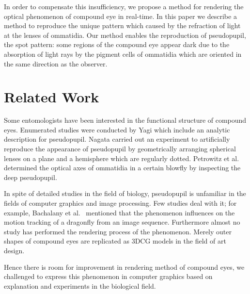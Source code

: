 In order to compensate this insufficiency, we propose a method for rendering the optical phenomenon of compound eye in real-time.
In this paper we describe a method to reproduce the unique pattern which caused by the refraction of light at the lenses of ommatidia.
Our method enables the reproduction of pseudopupil, the spot pattern: some regions of the compound eye appear dark due to the absorption of light rays by the pigment cells of ommatidia which are oriented in the same direction as the observer.


\section{Related Work}

Some entomologists have been interested in the functional structure of compound eyes.
Enumerated studies were conducted by Yagi\cite{} which include an analytic description for pseudopupil.
Nagata\cite{} carried out an experiment to artificially reproduce the appearance of pseudopupil by geometrically arranging spherical lenses on a plane and a hemisphere which are regularly dotted.
Petrowitz et al.\ \cite{} determined the optical axes of ommatidia in a certain blowfly by inspecting the deep pseudopupil.

In spite of detailed studies in the field of biology, pseudopupil is unfamiliar in the fields of computer graphics and image processing.
Few studies deal with it; for example, Bachalany et al.\ \cite{} mentioned that the phenomenon influences on the motion tracking of a dragonfly from an image sequence.
Furthermore almost no study has performed the rendering process of the phenomenon. Merely outer shapes of compound eyes are replicated as 3DCG models in the field of art design.

Hence there is room for improvement in rendering method of compound eyes, we challenged to express this phenomenon in computer graphics based on explanation and experiments in the biological field.  





